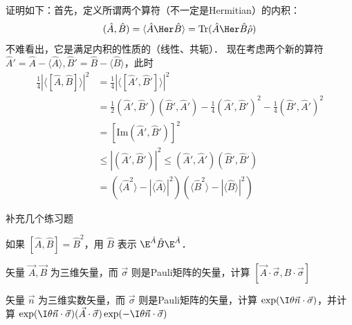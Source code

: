 证明如下：首先，定义所谓两个算符（不一定是Hermitian）的内积：
\begin{equation}
(\hat A, \hat B)=\langle\hat A\Her\hat B\rangle = \text{Tr}(\hat A\Her\hat B\hat\rho)
\end{equation}
不难看出，它是满足内积的性质的（线性、共轭）．
现在考虑两个新的算符 $\hat A'=\hat A-\langle\hat A\rangle, \hat B'=\hat B-\langle\hat B\rangle$，此时
\begin{equation}
\begin{split}
\frac{1}{4}|\langle[\hat A,\hat B]\rangle|^2&=\frac{1}{4}|\langle[\hat A',\hat B']\rangle|^2 \\
&=\frac{1}{2}(\hat A',\hat B')(\hat B',\hat A')-\frac{1}{4}(\hat A',\hat B')^2-\frac{1}{4}(\hat B',\hat A')^2\\
&=[\text{Im}(\hat A',\hat B')]^2\\
&\le |(\hat A',\hat B')|^2\le(\hat A',\hat A')(\hat B',\hat B')\\
&=(\langle\hat A^2\rangle - |\langle\hat A\rangle|^2)(\langle\hat B^2\rangle - |\langle\hat B\rangle|^2)
\end{split}
\end{equation}

补充几个练习题

\begin{exer}{}
如果 $[\hat A,\hat B]=\hat B^2$，用 $\hat B$ 表示 $\E^{\hat A}\hat B \E^{\hat A}$．
\end{exer}

\begin{exer}{}
矢量 $\vec A, \vec B$ 为三维矢量，而 $\vec{\sigma}$ 则是Pauli矩阵的矢量，计算 $[\vec A\cdot\vec{\sigma}, B\cdot\vec{\sigma}]$
\end{exer}{}

\begin{exer}{}
矢量 $\vec n$ 为三维实数矢量，而 $\vec{\sigma}$ 则是Pauli矩阵的矢量，计算 $\exp(\I\theta\vec n\cdot\vec{\sigma})$，并计算 $\exp(\I\theta\vec n\cdot\vec{\sigma})(\vec A\cdot\vec{\sigma})\exp(-\I\theta\vec n\cdot\vec{\sigma})$
\end{exer}